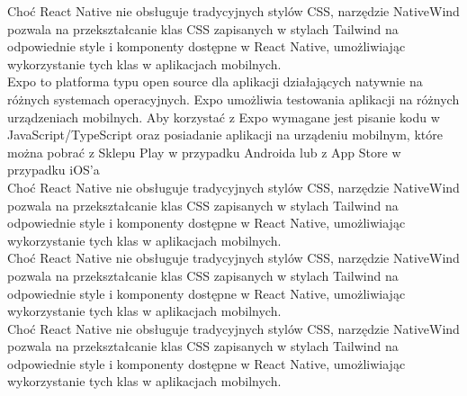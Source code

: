 Choć React Native nie obsługuje tradycyjnych stylów CSS, narzędzie NativeWind pozwala na przekształcanie klas CSS zapisanych w stylach Tailwind na odpowiednie style i komponenty dostępne w React Native, umożliwiając wykorzystanie tych klas w aplikacjach mobilnych.\\

\cite{expogo} Expo to platforma typu open source dla aplikacji działających natywnie na różnych systemach operacyjnych. Expo umożliwia testowania aplikacji na różnych urządzeniach mobilnych. Aby korzystać z Expo wymagane jest pisanie kodu w JavaScript/TypeScript oraz posiadanie aplikacji na urządeniu mobilnym, które można pobrać z Sklepu Play w przypadku Androida lub z App Store w przypadku iOS'a\\


Choć React Native nie obsługuje tradycyjnych stylów CSS, narzędzie NativeWind pozwala na przekształcanie klas CSS zapisanych w stylach Tailwind na odpowiednie style i komponenty dostępne w React Native, umożliwiając wykorzystanie tych klas w aplikacjach mobilnych.\\


Choć React Native nie obsługuje tradycyjnych stylów CSS, narzędzie NativeWind pozwala na przekształcanie klas CSS zapisanych w stylach Tailwind na odpowiednie style i komponenty dostępne w React Native, umożliwiając wykorzystanie tych klas w aplikacjach mobilnych.\\


Choć React Native nie obsługuje tradycyjnych stylów CSS, narzędzie NativeWind pozwala na przekształcanie klas CSS zapisanych w stylach Tailwind na odpowiednie style i komponenty dostępne w React Native, umożliwiając wykorzystanie tych klas w aplikacjach mobilnych.\\


